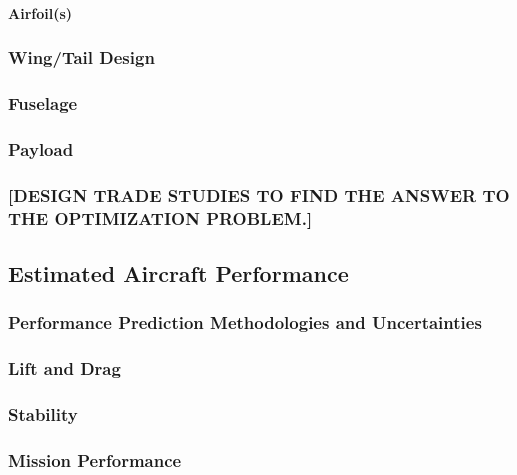 \documentclass[report]{byu-aero}
\begin{document}
\paragraph{Airfoil(s)}

\subsubsection{Wing/Tail Design}

\subsubsection{Fuselage}

\subsubsection{Payload}

\subsubsection{\color{\BYUred} [DESIGN TRADE STUDIES TO FIND THE ANSWER TO THE OPTIMIZATION PROBLEM.]}


\subsection{Estimated Aircraft Performance}
\label{ssec:estaircraftperfomance}

\subsubsection{Performance Prediction Methodologies and Uncertainties}
\label{sssec:uncertaintyanalysis}




\subsubsection{Lift and Drag}
\label{sssec:liftdrag}




\subsubsection{Stability}
\label{sssec:stability}



\subsubsection{Mission Performance}
\label{sssec:missionperformance}
\end{document}
